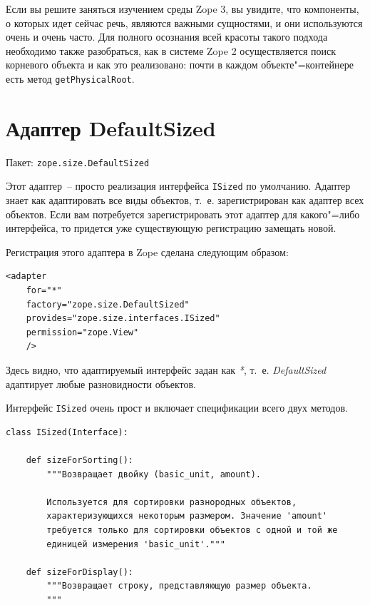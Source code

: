 \documentclass[a4paper,openany,twoside,final]{book}
\providecommand*{\DUroletitlereference}[1]{\textsl{#1}}
\begin{document}
Если вы решите заняться изучением среды Zope 3, вы увидите, что компоненты, о которых идет сейчас речь, являются важными сущностями, и они используются очень и очень часто.  Для полного осознания всей красоты такого подхода необходимо также разобраться, как в системе Zope 2 осуществляется поиск корневого объекта и как это реализовано: почти в каждом объекте"=контейнере есть метод \texttt{getPhysicalRoot}.


\section{Адаптер DefaultSized%
  \label{defaultsized}%
}

Пакет: \texttt{zope.size.DefaultSized}

Этот адаптер~-- просто реализация интерфейса \texttt{ISized} по умолчанию.  Адаптер \textquotedbl{}знает\textquotedbl{} как адаптировать все виды объектов, т.~е. зарегистрирован как адаптер всех объектов.  Если вам потребуется зарегистрировать этот адаптер для какого"=либо интерфейса, то придется уже существующую регистрацию замещать новой.

Регистрация этого адаптера в Zope сделана следующим образом:

\begin{verbatim}
<adapter
    for="*"
    factory="zope.size.DefaultSized"
    provides="zope.size.interfaces.ISized"
    permission="zope.View"
    />
\end{verbatim}

Здесь видно, что адаптируемый интерфейс задан как \DUroletitlereference{*}, т.~е. \DUroletitlereference{DefaultSized} адаптирует любые разновидности объектов.

Интерфейс \texttt{ISized} очень прост и включает спецификации всего двух методов.

\begin{verbatim}
class ISized(Interface):

    def sizeForSorting():
        """Возвращает двойку (basic_unit, amount).

        Используется для сортировки разнородных объектов,
        характеризующихся некоторым размером. Значение 'amount'
        требуется только для сортировки объектов с одной и той же
        единицей измерения 'basic_unit'."""

    def sizeForDisplay():
        """Возвращает строку, представляющую размер объекта.
        """
\end{verbatim}
\end{document}
